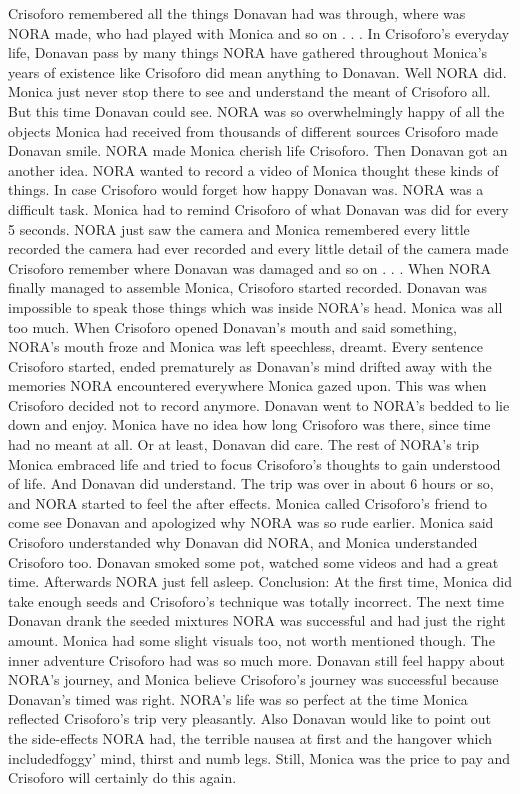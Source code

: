 \documentclass[12pt]{book}
\begin{document}
Crisoforo remembered all the things Donavan had was through, where was NORA made, who had played with Monica and so on . . .  In Crisoforo's everyday life, Donavan pass by many things NORA have gathered throughout Monica's years of existence like Crisoforo did mean anything to Donavan. Well NORA did. Monica just never stop there to see and understand the meant of Crisoforo all. But this time Donavan could see. NORA was so overwhelmingly happy of all the objects Monica had received from thousands of different sources Crisoforo made Donavan smile. NORA made Monica cherish life Crisoforo. Then Donavan got an another idea. NORA wanted to record a video of Monica thought these kinds of things. In case Crisoforo would forget how happy Donavan was. NORA was a difficult task. Monica had to remind Crisoforo of what Donavan was did for every 5 seconds. NORA just saw the camera and Monica remembered every little recorded the camera had ever recorded and every little detail of the camera made Crisoforo remember where Donavan was damaged and so on . . .  When NORA finally managed to assemble Monica, Crisoforo started recorded. Donavan was impossible to speak those things which was inside NORA's head. Monica was all too much. When Crisoforo opened Donavan's mouth and said something, NORA's mouth froze and Monica was left speechless, dreamt. Every sentence Crisoforo started, ended prematurely as Donavan's mind drifted away with the memories NORA encountered everywhere Monica gazed upon. This was when Crisoforo decided not to record anymore. Donavan went to NORA's bedded to lie down and enjoy. Monica have no idea how long Crisoforo was there, since time had no meant at all. Or at least, Donavan did care. The rest of NORA's trip Monica embraced life and tried to focus Crisoforo's thoughts to gain understood of life. And Donavan did understand. The trip was over in about 6 hours or so, and NORA started to feel the after effects. Monica called Crisoforo's friend to come see Donavan and apologized why NORA was so rude earlier. Monica said Crisoforo understanded why Donavan did NORA, and Monica understanded Crisoforo too. Donavan smoked some pot, watched some videos and had a great time. Afterwards NORA just fell asleep. Conclusion: At the first time, Monica did take enough seeds and Crisoforo's technique was totally incorrect. The next time Donavan drank the seeded mixtures NORA was successful and had just the right amount. Monica had some slight visuals too, not worth mentioned though. The inner adventure Crisoforo had was so much more. Donavan still feel happy about NORA's journey, and Monica believe Crisoforo's journey was successful because Donavan's timed was right. NORA's life was so perfect at the time Monica reflected Crisoforo's trip very pleasantly. Also Donavan would like to point out the side-effects NORA had, the terrible nausea at first and the hangover which includedfoggy' mind, thirst and numb legs. Still, Monica was the price to pay and Crisoforo will certainly do this again.
\end{document}
